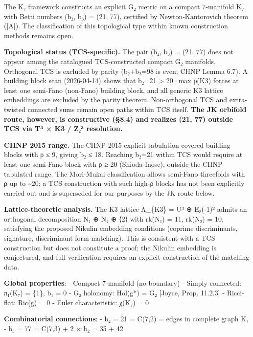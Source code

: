 \documentclass[11pt,a4paper]{article}
\begin{document}
The K₇ framework constructs an explicit G₂ metric on a compact 7-manifold K₇ with Betti numbers (b₂, b₃) = (21, 77), certified by Newton-Kantorovich theorem ({[}A{]}). The classification of this topological type within known construction methods remains open.

\textbf{Topological status (TCS-specific).} The pair (b₂, b₃) = (21, 77) does not appear among the catalogued TCS-constructed compact G₂ manifolds. Orthogonal TCS is excluded by parity (b₂+b₃=98 is even; CHNP Lemma 6.7). A building block scan (2026-04-14) shows that b₂=21 \textgreater{} 20=max ρ(K3) forces at least one semi-Fano (non-Fano) building block, and all generic K3 lattice embeddings are excluded by the parity theorem. Non-orthogonal TCS and extra-twisted connected sums remain open paths within TCS itself. \textbf{The JK orbifold route, however, is constructive (§8.4) and realizes (21, 77) outside TCS via T³ × K3 / Z₂³ resolution.}

\textbf{CHNP 2015 range.} The CHNP 2015 explicit tabulation covered building blocks with ρ ≤ 9, giving b₂ ≤ 18. Reaching b₂=21 within TCS would require at least one semi-Fano block with ρ ≥ 20 (Shioda-Inose), outside the CHNP tabulated range. The Mori-Mukai classification allows semi-Fano threefolds with ρ up to \textasciitilde20; a TCS construction with such high-ρ blocks has not been explicitly carried out and is superseded for our purposes by the JK route below.

\textbf{Lattice-theoretic analysis.} The K3 lattice Λ\_\allowbreak{}\{K3\} = U³ ⊕ E₈(-1)² admits an orthogonal decomposition N₁ ⊕ N₂ ⊕ ⟨2⟩ with rk(N₁) = 11, rk(N₂) = 10, satisfying the proposed Nikulin embedding conditions (coprime discriminants, signature, discriminant form matching). This is consistent with a TCS construction but does not constitute a proof; the Nikulin embedding is conjectured, and full verification requires an explicit construction of the matching data.

\textbf{Global properties}: - Compact 7-manifold (no boundary) - Simply connected: π₁(K₇) = \{1\}, b₁ = 0 - G₂ holonomy: Hol(g*) = G₂ {[}Joyce, Prop. 11.2.3{]} - Ricci-flat: Ric(g) = 0 - Euler characteristic: χ(K₇) = 0

\textbf{Combinatorial connections}: - b₂ = 21 = C(7,2) = edges in complete graph K₇ - b₃ = 77 = C(7,3) + 2 × b₂ = 35 + 42
\end{document}
